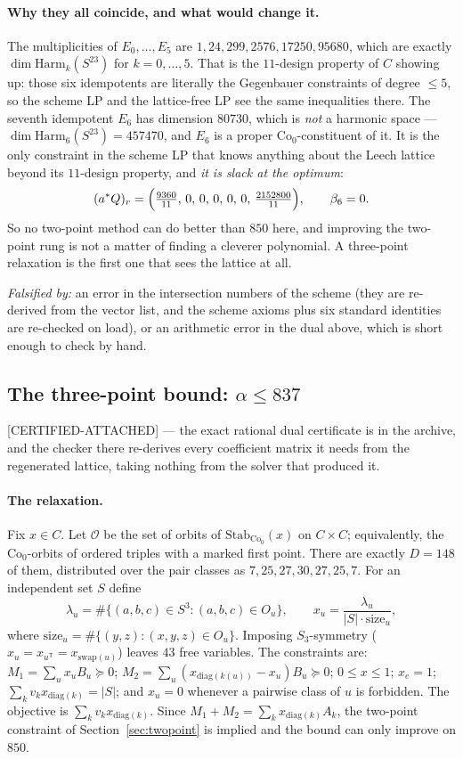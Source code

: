 \documentclass[10pt,a4paper]{article}
\newcommand{\CA}{\textsf{[CERTIFIED-ATTACHED]}}
\newcommand{\Co}{\mathrm{Co}_0}
\begin{document}
\paragraph{Why they all coincide, and what would change it.} The multiplicities of
$E_0,\dots,E_5$ are $1, 24, 299, 2576, 17250, 95680$, which are exactly
$\dim \mathrm{Harm}_k(S^{23})$ for $k = 0,\dots,5$. That is the $11$-design property of $C$
showing up: those six idempotents are literally the Gegenbauer constraints of degree $\le 5$,
so the scheme LP and the lattice-free LP see the same inequalities there. The seventh idempotent
$E_6$ has dimension $80730$, which is \emph{not} a harmonic space --- $\dim \mathrm{Harm}_6(S^{23})
= 457470$, and $E_6$ is a proper $\Co$-constituent of it. It is the only constraint in the scheme
LP that knows anything about the Leech lattice beyond its $11$-design property, and
\emph{it is slack at the optimum}:
\[
  (a^{*}Q)_r = \Bigl(\tfrac{9360}{11},\,0,\,0,\,0,\,0,\,0,\,\tfrac{2152800}{11}\Bigr),
  \qquad \beta_6 = 0 .
\]
So no two-point method can do better than $850$ here, and improving the two-point rung is not a
matter of finding a cleverer polynomial. A three-point relaxation is the first one that sees the
lattice at all.

\emph{Falsified by:} an error in the intersection numbers of the scheme (they are re-derived from
the vector list, and the scheme axioms plus six standard identities are re-checked on load), or
an arithmetic error in the dual above, which is short enough to check by hand.

\subsection{The three-point bound: $\alpha \le 837$}\label{sec:sdp3}

\CA{} --- the exact rational dual certificate is in the archive, and the checker there re-derives
every coefficient matrix it needs from the regenerated lattice, taking nothing from the solver that
produced it.

\paragraph{The relaxation.} Fix $x \in C$. Let $\mathcal{O}$ be the set of orbits of
$\mathrm{Stab}_{\Co}(x)$ on $C \times C$; equivalently, the $\Co$-orbits of ordered triples with a
marked first point. There are exactly $D = 148$ of them, distributed over the pair classes as
$7, 25, 27, 30, 27, 25, 7$. For an independent set $S$ define
\[
  \lambda_u = \#\{(a,b,c) \in S^3 : (a,b,c) \in O_u\},
  \qquad x_u = \frac{\lambda_u}{|S| \cdot \mathrm{size}_u},
\]
where $\mathrm{size}_u = \#\{(y,z) : (x,y,z) \in O_u\}$. Imposing $S_3$-symmetry
($x_u = x_{u^{\mathsf T}} = x_{\mathrm{swap}(u)}$) leaves $43$ free variables. The constraints are:
$M_1 = \sum_u x_u B_u \succeq 0$; $M_2 = \sum_u (x_{\mathrm{diag}(k(u))} - x_u) B_u \succeq 0$;
$0 \le x \le 1$; $x_e = 1$; $\sum_k v_k x_{\mathrm{diag}(k)} = |S|$; and $x_u = 0$ whenever a
pairwise class of $u$ is forbidden. The objective is $\sum_k v_k x_{\mathrm{diag}(k)}$. Since
$M_1 + M_2 = \sum_k x_{\mathrm{diag}(k)} A_k$, the two-point constraint of Section~\ref{sec:twopoint}
is implied and the bound can only improve on $850$.
\end{document}
